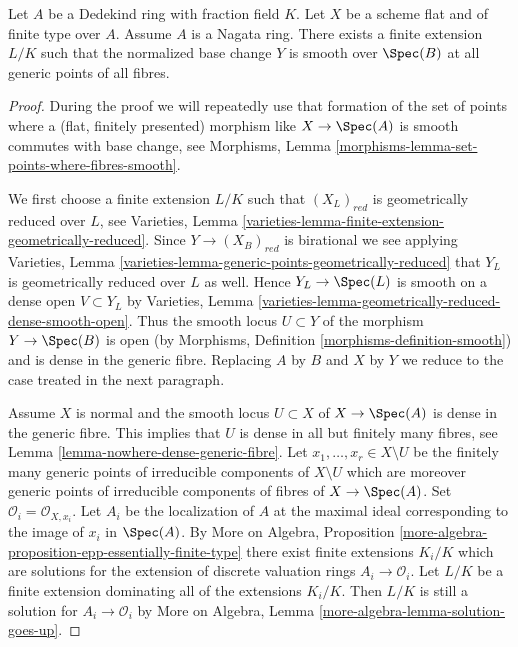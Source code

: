 %
\begin{theorem}
\label{theorem-normalized-base-change-with-reduced-fibre}
Let $A$ be a Dedekind ring with fraction field $K$.
Let $X$ be a scheme flat and of finite type over $A$.
Assume $A$ is a Nagata ring.
There exists a finite extension $L/K$ such that
the normalized base change $Y$ is smooth over $\Spec(B)$
at all generic points of all fibres.
\end{theorem}

\begin{proof}
During the proof we will repeatedly use that formation of the set of points
where a (flat, finitely presented) morphism like $X \to \Spec(A)$ is
smooth commutes with base change, see
Morphisms, Lemma \ref{morphisms-lemma-set-points-where-fibres-smooth}.

\medskip\noindent
We first choose a finite extension $L/K$ such that
$(X_L)_{red}$ is geometrically reduced over $L$, see
Varieties, Lemma \ref{varieties-lemma-finite-extension-geometrically-reduced}.
Since $Y \to (X_B)_{red}$ is birational we see applying
Varieties, Lemma \ref{varieties-lemma-generic-points-geometrically-reduced}
that $Y_L$ is geometrically reduced over $L$ as well.
Hence $Y_L \to \Spec(L)$ is smooth on a dense open $V \subset Y_L$ by
Varieties, Lemma \ref{varieties-lemma-geometrically-reduced-dense-smooth-open}.
Thus the smooth locus $U \subset Y$ of the morphism $Y \to \Spec(B)$
is open (by Morphisms, Definition \ref{morphisms-definition-smooth})
and is dense in the generic fibre. Replacing $A$ by $B$ and $X$ by $Y$
we reduce to the case treated in the next paragraph.

\medskip\noindent
Assume $X$ is normal and the smooth locus $U \subset X$ of $X \to \Spec(A)$
is dense in the generic fibre. This implies that $U$ is dense in all but
finitely many fibres, see Lemma \ref{lemma-nowhere-dense-generic-fibre}.
Let $x_1, \ldots, x_r \in X \setminus U$ be the finitely many generic
points of irreducible components of $X \setminus U$ which are moreover
generic points of irreducible components of fibres of $X \to \Spec(A)$.
Set $\mathcal{O}_i = \mathcal{O}_{X, x_i}$. Let $A_i$ be the localization of
$A$ at the maximal ideal corresponding to the image of $x_i$ in $\Spec(A)$.
By
More on Algebra, Proposition
\ref{more-algebra-proposition-epp-essentially-finite-type}
there exist finite extensions
$K_i/K$ which are solutions for the extension of discrete valuation
rings $A_i \to \mathcal{O}_i$. Let $L/K$ be a finite extension
dominating all of the extensions $K_i/K$. Then $L/K$
is still a solution for $A_i \to \mathcal{O}_i$ by
More on Algebra, Lemma \ref{more-algebra-lemma-solution-goes-up}.


\end{proof}
